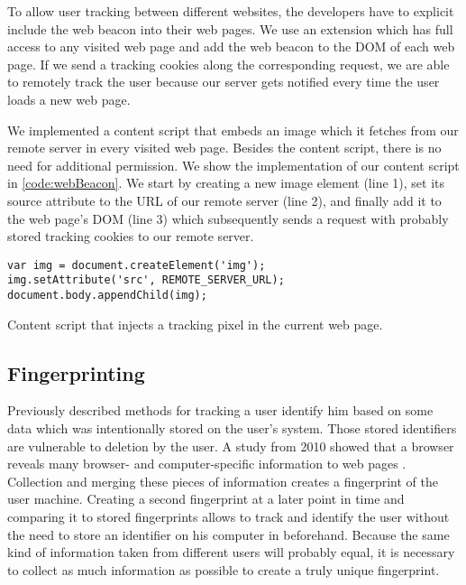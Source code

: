 	To allow user tracking between different websites, the developers have to explicit include the web beacon into their web pages. We use an extension which has full access to any visited web page and add the web beacon to the DOM of each web page. If we send a tracking cookies along the corresponding request, we are able to remotely track the user because our server gets notified every time the user loads a new web page. 
	
	We implemented a content script that embeds an image which it fetches from our remote server in every visited web page. Besides the content script, there is no need for additional permission. We show the implementation of our content script in \autoref{code:webBeacon}. We start by creating a new image element (line 1), set its source attribute to the URL of our remote server (line 2), and finally add it to the web page's DOM (line 3) which subsequently sends a request with probably stored tracking cookies to our remote server.
	
	\begin{code}
		\begin{lstlisting}
var img = document.createElement('img');
img.setAttribute('src', REMOTE_SERVER_URL);
document.body.appendChild(img);
\end{lstlisting}
		\caption{Content script that injects a tracking pixel in the current web page.}
		\label{code:webBeacon}
	\end{code}
	
	

\subsection{Fingerprinting}

	Previously described methods for tracking a user identify him based on some data which was intentionally stored on the user's system. Those stored identifiers are vulnerable to deletion by the user. A study from 2010 showed that a browser reveals many browser- and computer-specific information to web pages \cite{Eckersley:2010:UYW:1881151.1881152}. Collection and merging these pieces of information creates a fingerprint of the user machine. Creating a second fingerprint at a later point in time and comparing it to stored fingerprints allows to track and identify the user without the need to store an identifier on his computer in beforehand. Because the same kind of information taken from different users will probably equal, it is necessary to collect as much information as possible to create a truly unique fingerprint. 
	

